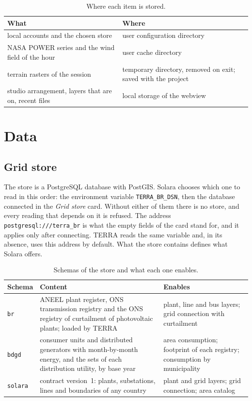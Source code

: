 \documentclass[10pt,a4paper,oneside]{article}
\begin{document}
\begin{table}[H]
\caption{Where each item is stored.}
\begin{tabularx}{\linewidth}{Y Y}
\toprule
\textbf{What} & \textbf{Where} \\
\midrule
local accounts and the chosen store & user configuration directory \\
NASA POWER series and the wind field of the hour & user cache directory \\
terrain rasters of the session & temporary directory, removed on exit; saved
  with the project \\
studio arrangement, layers that are on, recent files & local storage of the
  webview \\
\bottomrule
\end{tabularx}
\end{table}

\section{Data}

\subsection{Grid store}

The store is a PostgreSQL database with PostGIS. Solara chooses which one to
read in this order: the environment variable \texttt{TERRA\_BR\_DSN}, then
the database connected in the \emph{Grid store} card. Without either of them
there is no store, and every reading that depends on it is refused. The
address \texttt{postgresql:///terra\_br} is what the empty fields of the card
stand for, and it applies only after connecting. TERRA reads the same
variable and, in its absence, uses this address by default. What the store
contains defines what Solara offers.

\begin{table}[H]
\caption{Schemas of the store and what each one enables.}
\begin{tabularx}{\linewidth}{l Y Y}
\toprule
\textbf{Schema} & \textbf{Content} & \textbf{Enables} \\
\midrule
\texttt{br} & ANEEL plant register, ONS transmission registry and the ONS
  registry of curtailment of photovoltaic plants; loaded by TERRA & plant,
  line and bus layers; grid connection with curtailment \\
\texttt{bdgd} & consumer units and distributed generators with month-by-month
  energy, and the sets of each distribution utility, by base year & area
  consumption; footprint of each registry; consumption by municipality \\
\texttt{solara} & contract version~1: plants, substations, lines and
  boundaries of any country & plant and grid layers; grid connection; area
  catalog \\
\bottomrule
\end{tabularx}
\end{table}
\end{document}
